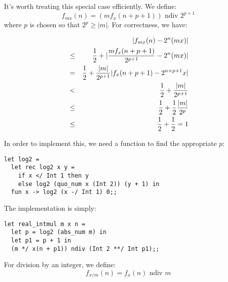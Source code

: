 \begin{slide*}


\vspace*{0.5cm}

It's worth treating this special case efficiently.
We define:
{\red $$ f_{m x}(n) = (m f_x(n+p+1)) \mbox{ ndiv } 2^{p+1} $$}
\noindent where {\red $p$} is chosen so that {\red $2^p \geq |m|$}. For correctness, we have:

{\red \begin{eqnarray*}
&      & |f_{m x}(n) - 2^n (m x)|                                       \\
& \leq & {1 \over 2} + |{m f_x(n+p+1) \over 2^{p+1}} - 2^n (m x)|       \\
& =    & {1 \over 2} + {|m| \over 2^{p+1}} |f_x(n+p+1) - 2^{n+p+1} x|   \\
& <    & {1 \over 2} + {|m| \over 2^{p+1}}                              \\
& \leq & {1 \over 2} + {1 \over 2} {|m| \over 2^p}                      \\
& \leq & {1 \over 2} + {1 \over 2} = 1
\end{eqnarray*}}

\end{slide*}


\begin{slide*}


\vspace*{0.5cm}

In order to implement this, we need a function to find the appropriate {\red $p$}:
\begin{black}\begin{verbatim}
let log2 =
  let rec log2 x y =
    if x </ Int 1 then y
    else log2 (quo_num x (Int 2)) (y + 1) in
  fun x -> log2 (x -/ Int 1) 0;;
\end{verbatim}\end{black}
\noindent The implementation is simply:
\begin{black}\begin{verbatim}
let real_intmul m x n =
  let p = log2 (abs_num m) in
  let p1 = p + 1 in
  (m */ x(n + p1)) ndiv (Int 2 **/ Int p1);;
\end{verbatim}\end{black}
\noindent For division by an integer, we define:
{\red $$ f_{x / m}(n) = f_x(n) \mbox{ ndiv } m $$}

\end{slide*}




